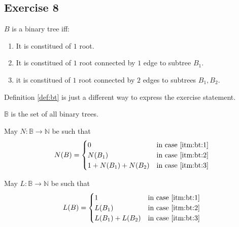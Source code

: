 \subsection{Exercise 8}
\begin{definition}
\label{def:bt}
	$B$ is a binary tree iff:
	\begin{enumerate}
  		\item \label{itm:bt:1} It is constitued of $1$ root.
  		\item \label{itm:bt:2} It is constitued of $1$ root connected by $1$ edge to  subtree $B_1$.
  		\item \label{itm:bt:3} it is constitued of $1$ root connected by $2$ edges to subtrees $B_1,B_2$.
	\end{enumerate}
\end{definition}
\begin{remark}
	Definition \ref{def:bt} is just a different way to express the exercise statement.
\end{remark}
\begin{definition}
	$\mathbb{B}$ is the set of all binary trees.
\end{definition}
\begin{definition}
	May $N\colon\mathbb{B}\rightarrow\mathbb{N}$ be such that
	\begin{alignat*}{2}
		N(B)= \begin{cases}
			  0               & \text{in case \ref{itm:bt:1}}\\
			  N(B_1)          & \text{in case \ref{itm:bt:2}}\\
			  1+N(B_1)+N(B_2) & \text{in case \ref{itm:bt:3}}\\
			  \end{cases}
	\end{alignat*}
\end{definition}
\begin{definition}
	May $L\colon\mathbb{B}\rightarrow\mathbb{N}$ be such that
	\begin{alignat*}{2}
		L(B)= \begin{cases}
			  1             & \text{in case \ref{itm:bt:1}}\\
			  L(B_1)        & \text{in case \ref{itm:bt:2}}\\
			  L(B_1)+L(B_2) & \text{in case \ref{itm:bt:3}}\\
			  \end{cases}
	\end{alignat*}
\end{definition}
